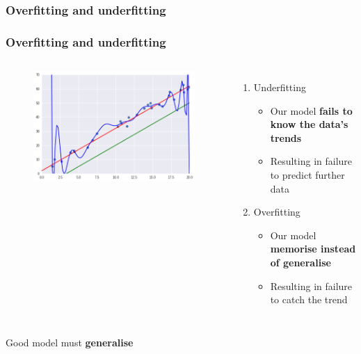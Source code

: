 \documentclass[]{beamer}
\begin{document}
\subsubsection{Overfitting and underfitting}
\begin{frame}
\frametitle{Overfitting and underfitting}
\begin{columns}
\begin{figure}
\includegraphics[scale=.3]{imgs/linreg_2.png}
\end{figure}
\begin{enumerate}
\item<2-> Underfitting
\begin{itemize}
\item<3-> Our model \textbf{fails to know the data's trends}
\item<4-> Resulting in failure to predict further data
\end{itemize}
\item<5-> Overfitting
\begin{itemize}
\item<6-> Our model \textbf{memorise instead of generalise}
\item<7-> Resulting in failure to catch the trend
\end{itemize}
\end{enumerate}
\end{columns}
\end{frame}

\begin{frame}
\begin{center}
{\LARGE Good model must \textbf{generalise}}\\
\end{center}
\end{frame}
\end{document}
